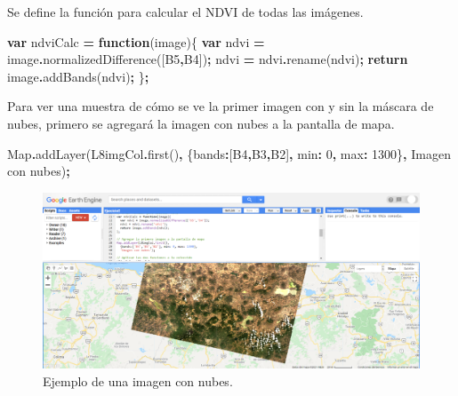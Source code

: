 \documentclass[
  12pt,
  letterpaper,
  twoside]{book}
\newenvironment{Shaded}{\begin{snugshade}}{\end{snugshade}}
\newcommand{\BuiltInTok}[1]{#1}
\newcommand{\ControlFlowTok}[1]{\textcolor[rgb]{0.13,0.29,0.53}{\textbf{#1}}}
\newcommand{\DataTypeTok}[1]{\textcolor[rgb]{0.13,0.29,0.53}{#1}}
\newcommand{\DecValTok}[1]{\textcolor[rgb]{0.00,0.00,0.81}{#1}}
\newcommand{\FunctionTok}[1]{\textcolor[rgb]{0.00,0.00,0.00}{#1}}
\newcommand{\KeywordTok}[1]{\textcolor[rgb]{0.13,0.29,0.53}{\textbf{#1}}}
\newcommand{\NormalTok}[1]{#1}
\newcommand{\OperatorTok}[1]{\textcolor[rgb]{0.81,0.36,0.00}{\textbf{#1}}}
\newcommand{\StringTok}[1]{\textcolor[rgb]{0.31,0.60,0.02}{#1}}
\begin{document}
Se define la función para calcular el NDVI de todas las imágenes.

\begin{Shaded}
\begin{Highlighting}[]
\KeywordTok{var}\NormalTok{ ndviCalc }\OperatorTok{=} \KeywordTok{function}\NormalTok{(image)\{}
  \KeywordTok{var}\NormalTok{ ndvi }\OperatorTok{=}\NormalTok{ image}\OperatorTok{.}\FunctionTok{normalizedDifference}\NormalTok{([}\StringTok{\textquotesingle{}B5\textquotesingle{}}\OperatorTok{,}\StringTok{\textquotesingle{}B4\textquotesingle{}}\NormalTok{])}\OperatorTok{;}
\NormalTok{  ndvi }\OperatorTok{=}\NormalTok{ ndvi}\OperatorTok{.}\FunctionTok{rename}\NormalTok{(}\StringTok{\textquotesingle{}ndvi\textquotesingle{}}\NormalTok{)}\OperatorTok{;}
    \ControlFlowTok{return}\NormalTok{ image}\OperatorTok{.}\FunctionTok{addBands}\NormalTok{(ndvi)}\OperatorTok{;}
\NormalTok{\}}\OperatorTok{;}
\end{Highlighting}
\end{Shaded}

Para ver una muestra de cómo se ve la primer imagen con y sin la máscara de nubes, primero se agregará la imagen con nubes a la pantalla de mapa.

\begin{Shaded}
\begin{Highlighting}[]
\BuiltInTok{Map}\OperatorTok{.}\FunctionTok{addLayer}\NormalTok{(L8imgCol}\OperatorTok{.}\FunctionTok{first}\NormalTok{()}\OperatorTok{,} 
\NormalTok{  \{}\DataTypeTok{bands}\OperatorTok{:}\NormalTok{[}\StringTok{\textquotesingle{}B4\textquotesingle{}}\OperatorTok{,}\StringTok{\textquotesingle{}B3\textquotesingle{}}\OperatorTok{,}\StringTok{\textquotesingle{}B2\textquotesingle{}}\NormalTok{]}\OperatorTok{,} \DataTypeTok{min}\OperatorTok{:} \DecValTok{0}\OperatorTok{,} \DataTypeTok{max}\OperatorTok{:} \DecValTok{1300}\NormalTok{\}}\OperatorTok{,}
  \StringTok{\textquotesingle{}Imagen con nubes\textquotesingle{}}\NormalTok{)}\OperatorTok{;}
\end{Highlighting}
\end{Shaded}

\begin{figure}

{\centering \includegraphics[width=1\linewidth]{Img/imNubes} 

}

\caption{Ejemplo de una imagen con nubes.}\label{fig:unnamed-chunk-151}
\end{figure}
\end{document}
